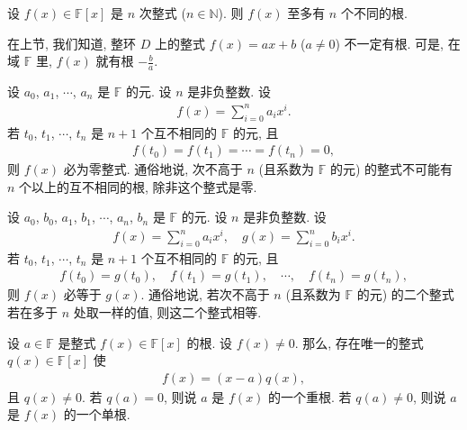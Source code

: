 \begin{proposition}
    设 $f(x) \in \mathbb{F}[x]$ 是 $n$ 次整式 ($n \in \mathbb{N}$). 则 $f(x)$ 至多有 $n$ 个不同的根.
\end{proposition}

\begin{remark}
    在上节, 我们知道, 整环 $D$ 上的整式 $f(x) = ax + b$ ($a \neq 0$) 不一定有根. 可是, 在域 $\mathbb{F}$ 里, $f(x)$ 就有根 $-\frac{b}{a}$.
\end{remark}

\begin{proposition}
    设 $a_0$, $a_1$, $\cdots$, $a_n$ 是 $\mathbb{F}$ 的元. 设 $n$ 是非负整数. 设
    \begin{align*}
        f(x) = \sum_{i = 0}^n a_i x^i.
    \end{align*}
    若 $t_0$, $t_1$, $\cdots$, $t_n$ 是 $n+1$ 个互不相同的 $\mathbb{F}$ 的元, 且
    \begin{align*}
        f(t_0) = f(t_1) = \cdots = f(t_n) = 0,
    \end{align*}
    则 $f(x)$ 必为零整式. 通俗地说, 次不高于 $n$ (且系数为 $\mathbb{F}$ 的元) 的整式不可能有 $n$ 个以上的互不相同的根, 除非这个整式是零.
\end{proposition}

\begin{proposition}
    设 $a_0$, $b_0$, $a_1$, $b_1$, $\cdots$, $a_n$, $b_n$ 是 $\mathbb{F}$ 的元. 设 $n$ 是非负整数. 设
    \begin{align*}
        f(x) = \sum_{i = 0}^n a_i x^i, \quad g(x) = \sum_{i = 0}^n b_i x^i.
    \end{align*}
    若 $t_0$, $t_1$, $\cdots$, $t_n$ 是 $n+1$ 个互不相同的 $\mathbb{F}$ 的元, 且
    \begin{align*}
        f(t_0) = g(t_0), \quad f(t_1) = g(t_1), \quad \cdots, \quad f(t_n) = g(t_n),
    \end{align*}
    则 $f(x)$ 必等于 $g(x)$. 通俗地说, 若次不高于 $n$ (且系数为 $\mathbb{F}$ 的元) 的二个整式若在多于 $n$ 处取一样的值, 则这二个整式相等.
\end{proposition}

\begin{definition}
    设 $a \in \mathbb{F}$ 是整式 $f(x) \in \mathbb{F}[x]$ 的根. 设 $f(x) \neq 0$. 那么, 存在唯一的整式 $q(x) \in \mathbb{F}[x]$ 使
    \begin{align*}
        f(x) = (x - a) q(x),
    \end{align*}
    且 $q(x) \neq 0$. 若 $q(a) = 0$, 则说 $a$ 是 $f(x)$ 的一个重根. 若 $q(a) \neq 0$, 则说 $a$ 是 $f(x)$ 的一个单根.
\end{definition}

